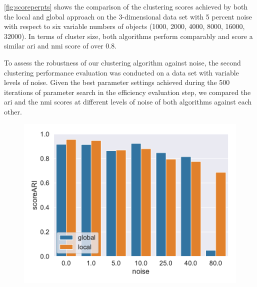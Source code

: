 \autoref{fig:scoreperpts} shows the comparison of the clustering scores achieved by both the local and global approach on the 3-dimensional data set with 5 percent noise with respect to six variable numbers of objects (1000, 2000, 4000, 8000, 16000, 32000). In terms of cluster size, both algorithms perform comparably and score a similar \gls{ari} and \gls{nmi} score of over $0.8$. 

To assess the robustness of our clustering algorithm against noise, the second clustering performance evaluation was conducted on a data set with variable levels of noise. Given the best parameter settings achieved during the 500 iterations of parameter search in the efficiency evaluation step, we compared the \gls{ari} and the \gls{nmi} scores at different levels of noise of both algorithms against each other.
\begin{figure}[h]
    \centering
    \begin{minipage}[t]{.5\textwidth}
      \centering  
      \captionsetup{width=.9\linewidth}
      \includegraphics[width=\textwidth]{evaluation/per_noise/Best_ARI_3D_O10000_pnoise_bar.pdf}
      \label{fig:ariperpts}
    \end{minipage}%
    \begin{minipage}[t]{.5\textwidth}
      \centering
      \captionsetup{width=.9\linewidth}

\end{minipage}
\end{figure}
